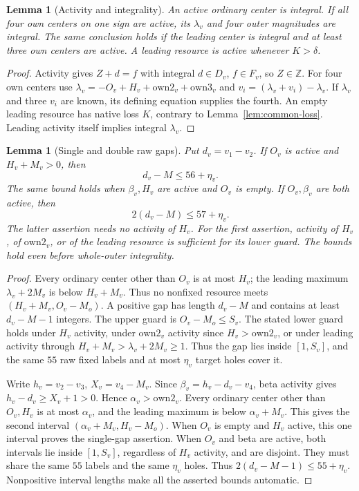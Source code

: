 \documentclass[11pt,letterpaper]{article}
\newcommand{\Z}{\mathbb Z}\newcommand{\R}{\mathbb R}
\newtheorem{lemma}[theorem]{Lemma}
\theoremstyle{definition}\newtheorem{definition}[theorem]{Definition}
\begin{document}
\begin{lemma}[Activity and integrality]\label{lem:common-integrality}
An active ordinary center is integral. If all four own centers on one
sign are active, its $\lambda_v$ and four outer magnitudes are integral.
The same conclusion holds if the leading center is integral and at
least three own centers are active. A leading resource is active
whenever $K>\delta$.
\end{lemma}
\begin{proof}
Activity gives $Z+d=f$ with integral $d\in D_v$, $f\in F_v$, so
$Z\in\Z$. For four own centers use
$\lambda_v=-O_v+H_v+\mathrm{own2}_v+\mathrm{own3}_v$ and
$v_i=(\lambda_v+v_i)-\lambda_v$. If $\lambda_v$ and three $v_i$
are known, its defining equation supplies the fourth. An empty leading
resource has native loss $K$, contrary to Lemma~\ref{lem:common-loss}.
Leading activity itself implies integral $\lambda_v$.
\end{proof}

\begin{lemma}[Single and double raw gaps]\label{lem:common-raw-gaps}
Put $d_v=v_1-v_2$. If $O_v$ is active and $H_v+M_v>0$, then
\begin{equation}\label{eq:common-single-gap}
d_v-M\le56+\eta_v.
\end{equation}
The same bound holds when $\beta_v,H_v$ are active and $O_v$ is empty.
If $O_v,\beta_v$ are both active, then
\begin{equation}\label{eq:common-double-gap}
2(d_v-M)\le57+\eta_v.
\end{equation}
The latter assertion needs no activity of $H_v$. For the first assertion, activity of $H_v$, of $\mathrm{own2}_v$, or of the leading resource is sufficient for its lower guard. The bounds hold even before whole-outer integrality.
\end{lemma}
\begin{proof}
Every ordinary center other than $O_v$ is at most $H_v$; the leading
maximum $\lambda_v+2M_v$ is below $H_v+M_v$. Thus no nonfixed
resource meets $(H_v+M_v,O_v-M_o)$. A positive gap has length $d_v-M$ and contains at least $d_v-M-1$ integers. The upper guard is $O_v-M_o\le S_v$. The stated lower guard holds under $H_v$ activity, under $\mathrm{own2}_v$ activity since $H_v>\mathrm{own2}_v$, or under leading activity through $H_v+M_v>\lambda_v+2M_v\ge1$. Thus the gap lies inside $[1,S_v]$, and the same $55$
raw fixed labels and at most $\eta_v$ target holes cover it.

Write $h_v=v_2-v_3$, $X_v=v_4-M_v$. Since
$\beta_v=h_v-d_v-v_4$, beta activity gives
$h_v-d_v\ge X_v+1>0$. Hence $\alpha_v>\mathrm{own2}_v$.
Every ordinary center other than $O_v,H_v$ is at most $\alpha_v$,
and the leading maximum is below $\alpha_v+M_v$.
This gives the second interval $(\alpha_v+M_v,H_v-M_o)$.
When $O_v$ is empty and $H_v$ active, this one interval proves the
single-gap assertion. When $O_v$ and beta are active, both intervals
lie inside $[1,S_v]$, regardless of $H_v$ activity, and are disjoint.
They must share the same $55$ labels and the same $\eta_v$ holes.
Thus $2(d_v-M-1)\le55+\eta_v$. Nonpositive interval lengths make
all the asserted bounds automatic.
\end{proof}
\end{document}
